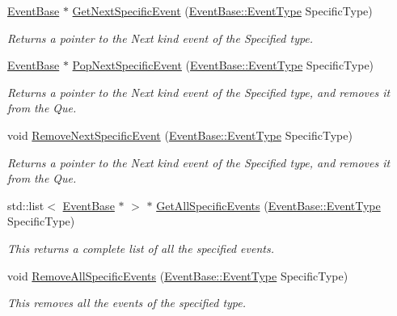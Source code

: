 \begin{DoxyCompactItemize}
\hyperlink{classphys_1_1EventBase}{EventBase} $\ast$ \hyperlink{classphys_1_1EventManager_a7340cfab326856cf4ebc653b11101016}{GetNextSpecificEvent} (\hyperlink{classphys_1_1EventBase_a5e6a8564e127f654123f0bf6a2751923}{EventBase::EventType} SpecificType)
\begin{DoxyCompactList}\small\item\em Returns a pointer to the Next kind event of the Specified type. \item\end{DoxyCompactList}\item 
\hyperlink{classphys_1_1EventBase}{EventBase} $\ast$ \hyperlink{classphys_1_1EventManager_a156ba3c53cc799499272430111bbdfa4}{PopNextSpecificEvent} (\hyperlink{classphys_1_1EventBase_a5e6a8564e127f654123f0bf6a2751923}{EventBase::EventType} SpecificType)
\begin{DoxyCompactList}\small\item\em Returns a pointer to the Next kind event of the Specified type, and removes it from the Que. \item\end{DoxyCompactList}\item 
void \hyperlink{classphys_1_1EventManager_a486c1173a2c1a64885bfdbe7ca267611}{RemoveNextSpecificEvent} (\hyperlink{classphys_1_1EventBase_a5e6a8564e127f654123f0bf6a2751923}{EventBase::EventType} SpecificType)
\begin{DoxyCompactList}\small\item\em Returns a pointer to the Next kind event of the Specified type, and removes it from the Que. \item\end{DoxyCompactList}\item 
std::list$<$ \hyperlink{classphys_1_1EventBase}{EventBase} $\ast$ $>$ $\ast$ \hyperlink{classphys_1_1EventManager_a300e537d27cd53ac8276438d4c91a3f6}{GetAllSpecificEvents} (\hyperlink{classphys_1_1EventBase_a5e6a8564e127f654123f0bf6a2751923}{EventBase::EventType} SpecificType)
\begin{DoxyCompactList}\small\item\em This returns a complete list of all the specified events. \item\end{DoxyCompactList}\item 
void \hyperlink{classphys_1_1EventManager_ac38a5a7d003a3f92e40c842916094bde}{RemoveAllSpecificEvents} (\hyperlink{classphys_1_1EventBase_a5e6a8564e127f654123f0bf6a2751923}{EventBase::EventType} SpecificType)
\begin{DoxyCompactList}\small\item\em This removes all the events of the specified type. \item\end{DoxyCompactList}\item 

\end{DoxyCompactItemize}
